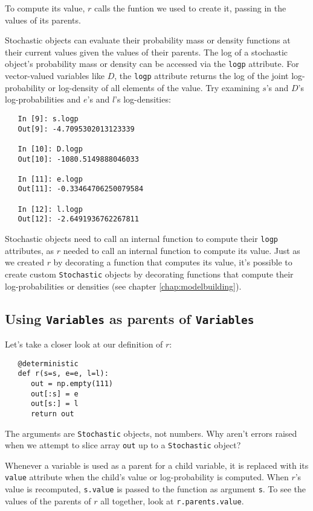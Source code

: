 To compute its value, $r$ calls the funtion we used to create it, passing in the values of its parents.

Stochastic objects can evaluate their probability mass or density functions at their current values given the values of their parents. The log of a stochastic object's probability mass or density can be accessed via the \texttt{logp} attribute. For vector-valued variables like $D$, the \texttt{logp} attribute returns the log of the joint log-probability or log-density of all elements of the value. Try examining $s$'s and $D$'s log-probabilities and $e$'s and $l$'s log-densities:
\begin{verbatim}
   In [9]: s.logp
   Out[9]: -4.7095302013123339

   In [10]: D.logp
   Out[10]: -1080.5149888046033

   In [11]: e.logp
   Out[11]: -0.33464706250079584

   In [12]: l.logp
   Out[12]: -2.6491936762267811
\end{verbatim}
Stochastic objects need to call an internal function to compute their \texttt{logp} attributes, as $r$ needed to call an internal function to compute its value. Just as we created $r$ by decorating a function that computes its value, it's possible to create custom \texttt{Stochastic} objects by decorating functions that compute their log-probabilities or densities (see chapter \ref{chap:modelbuilding}). 

\subsection*{Using \texttt{Variables} as parents of \texttt{Variables}}

Let's take a closer look at our definition of $r$:
\begin{verbatim}
   @deterministic
   def r(s=s, e=e, l=l):
      out = np.empty(111)
      out[:s] = e
      out[s:] = l
      return out
\end{verbatim}
The arguments are \texttt{Stochastic} objects, not numbers. Why aren't errors raised when we attempt to slice array \texttt{out} up to a \texttt{Stochastic} object?

Whenever a variable is used as a parent for a child variable, it is replaced with its \texttt{value} attribute when the child's value or log-probability is computed. When $r$'s value is recomputed, \texttt{s.value} is passed to the function as argument \texttt{s}. To see the values of the parents of $r$ all together, look at \texttt{r.parents.value}.

